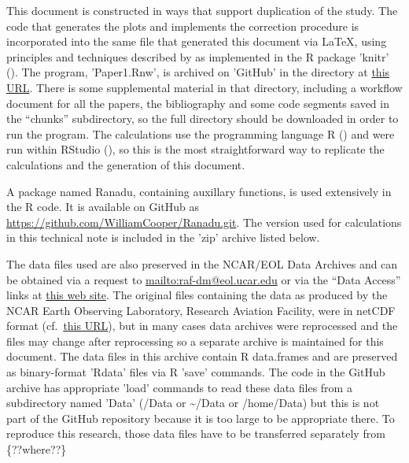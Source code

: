 \documentclass[11pt,twoside,american,12pt,twoside,american]{article}\usepackage[]{graphicx}\usepackage[]{color}
\let\OrgIndex\index
\renewcommand*{\index}[1]{\OrgIndex{#1}}
\begin{document}
This document is constructed in ways that
support duplication of the study. The code that generates the plots
and implements the correction procedure is incorporated into the same
file that generated this document via \LaTeX,
using principles and techniques described by \citet{Xie2014a} as
implemented in the R package
'knitr' (\citet{Xie2014b}). The program, 'Paper1.Rnw', is archived
on 'GitHub' in the directory
at \href{https://github.com/WilliamCooper/KalmanFilter.git}{this URL}.
There is some supplemental material
in that directory, including a workflow document
for all the papers, the bibliography and some code segments saved
in the ``chunks'' subdirectory,
so the full directory should be downloaded in order to run the program.
The calculations use the programming language R
(\citet{Rlanguage}) and were run within RStudio (\citet{RStudio2012}),
so this is the most straightforward way to replicate the calculations
and the generation of this document.

A package named Ranadu,
containing auxillary functions, is used extensively
in the R code. It is available on GitHub
as \href{https://github.com/WilliamCooper/Ranadu.git}{https://github.com/WilliamCooper/Ranadu.git}.
The version used for calculations in this technical note is included
in the 'zip' archive listed below.

The data files used are also preserved in the NCAR/EOL
Data Archives and can be obtained via a request
to \url{mailto:raf-dm@eol.ucar.edu} or via the ``Data Access''
links at \href{https://www.eol.ucar.edu/all-field-projects-and-deployments}{this web site}.
The original files containing the data as produced by the NCAR Earth
Observing Laboratory, Research Aviation Facility, were in netCDF
format (cf.~\href{http://www.unidata.ucar.edu/software/netcdf/}{this URL}),
but in many cases data archives were reprocessed and the files may
change after reprocessing so a separate archive
is maintained for this document. The data files
in this archive contain R data.frames
and are preserved as binary-format 'Rdata' files via R 'save' commands.
The code in the GitHub archive has appropriate 'load' commands to
read these data files from a subdirectory named 'Data' (/Data or \textasciitilde /Data
or /home/Data) but this is not part of the GitHub repository because
it is too large to be appropriate there. To reproduce this research,
those data files have to be transferred separately from \{??where??\}
\end{document}
